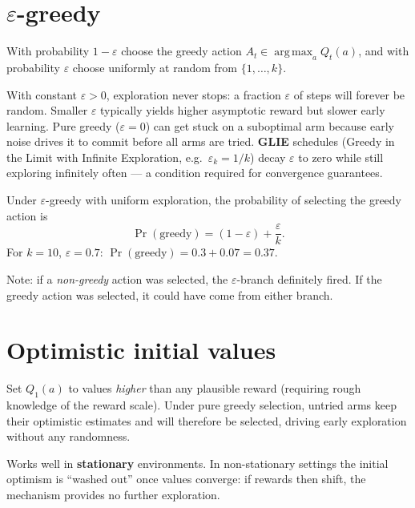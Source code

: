 \documentclass[11pt, oneside]{book}
\newcommand{\argmax}{\operatorname*{arg\,max}}
\begin{document}
\section{$\varepsilon$-greedy}

\begin{defbox}[title={$\varepsilon$-Greedy Action Selection}]
With probability $1 - \varepsilon$ choose the greedy action
$A_t \in \argmax_a Q_t(a)$, and with probability $\varepsilon$ choose
uniformly at random from $\{1,\dots,k\}$.
\end{defbox}

With constant $\varepsilon > 0$, exploration never stops: a fraction
$\varepsilon$ of steps will forever be random. Smaller $\varepsilon$ typically
yields higher asymptotic reward but slower early learning. Pure greedy
($\varepsilon=0$) can get stuck on a suboptimal arm because early noise drives
it to commit before all arms are tried. \textbf{GLIE} schedules (Greedy in
the Limit with Infinite Exploration, e.g.\ $\varepsilon_k = 1/k$) decay
$\varepsilon$ to zero while still exploring infinitely often --- a condition
required for convergence guarantees.

\begin{exbox}[title={Greedy Selection Probability}]
Under $\varepsilon$-greedy with uniform exploration, the probability of
selecting the greedy action is
\[
  \Pr(\text{greedy}) = (1-\varepsilon) + \frac{\varepsilon}{k}.
\]
For $k=10$, $\varepsilon = 0.7$: $\Pr(\text{greedy}) = 0.3 + 0.07 = 0.37$.

Note: if a \emph{non-greedy} action was selected, the $\varepsilon$-branch
definitely fired. If the greedy action was selected, it could have come from
either branch.
\end{exbox}

\section{Optimistic initial values}

\begin{intbox}[title={Optimistic Initialization}]
Set $Q_1(a)$ to values \emph{higher} than any plausible reward (requiring
rough knowledge of the reward scale). Under pure greedy selection, untried
arms keep their optimistic estimates and will therefore be selected, driving
early exploration without any randomness.

Works well in \textbf{stationary} environments. In non-stationary settings
the initial optimism is ``washed out'' once values converge: if rewards then
shift, the mechanism provides no further exploration.
\end{intbox}
\end{document}
